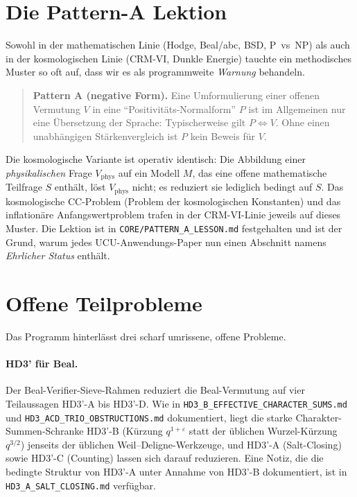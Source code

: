 \documentclass[11pt,a4paper]{article}
\theoremstyle{remark}
\begin{document}
\section{Die Pattern-A Lektion}
\label{sec:pattern-a}

Sowohl in der mathematischen Linie (Hodge, Beal/abc, BSD, P~vs~NP) als auch in der kosmologischen Linie (CRM-VI, Dunkle Energie) tauchte ein methodisches Muster so oft auf, dass wir es als programmweite \emph{Warnung} behandeln.

\begin{quote}
\textbf{Pattern A (negative Form).}
Eine Umformulierung einer offenen Vermutung $V$ in eine ``Positivitäts-Normalform'' $P$ ist im Allgemeinen nur eine Übersetzung der Sprache: Typischerweise gilt $P \Leftrightarrow V$. Ohne einen unabhängigen Stärkenvergleich ist $P$ kein Beweis für $V$.
\end{quote}

\noindent Die kosmologische Variante ist operativ identisch: Die Abbildung einer \emph{physikalischen} Frage $V_{\text{phys}}$ auf ein Modell $M$, das eine offene mathematische Teilfrage $S$ enthält, löst $V_{\text{phys}}$ nicht; es reduziert sie lediglich bedingt auf $S$. Das kosmologische CC-Problem (Problem der kosmologischen Konstanten) und das inflationäre Anfangswertproblem trafen in der CRM-VI-Linie jeweils auf dieses Muster. Die Lektion ist in \texttt{CORE/PATTERN\_A\_LESSON.md} festgehalten und ist der Grund, warum jedes UCU-Anwendungs-Paper nun einen Abschnitt namens \emph{Ehrlicher Status} enthält.

\section{Offene Teilprobleme}
\label{sec:open}

Das Programm hinterlässt drei scharf umrissene, offene Probleme.

\paragraph{HD3' für Beal.}
Der Beal-Verifier-Sieve-Rahmen reduziert die Beal-Vermutung auf vier Teilaussagen HD3'-A bis HD3'-D. Wie in \texttt{HD3\_B\_EFFECTIVE\_CHARACTER\_SUMS.md} und \texttt{HD3\_ACD\_TRIO\_OBSTRUCTIONS.md} dokumentiert, liegt die starke Charakter-Summen-Schranke HD3'-B (Kürzung $q^{1+\varepsilon}$ statt der üblichen Wurzel-Kürzung $q^{3/2}$) jenseits der üblichen Weil--Deligne-Werkzeuge, und HD3'-A (Salt-Closing) sowie HD3'-C (Counting) lassen sich darauf reduzieren. Eine Notiz, die die bedingte Struktur von HD3'-A unter Annahme von HD3'-B dokumentiert, ist in \texttt{HD3\_A\_SALT\_CLOSING.md} verfügbar.
\end{document}
